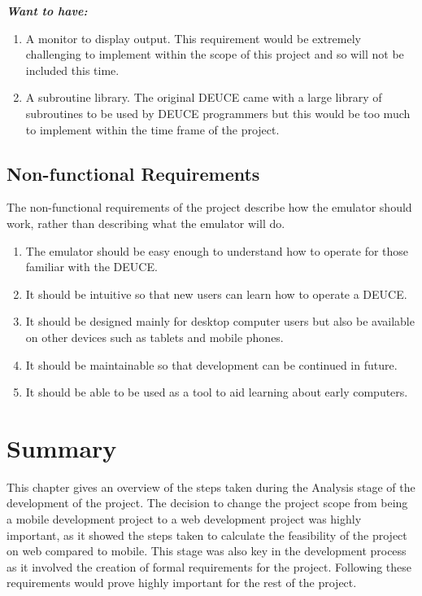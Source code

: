 \documentclass{l4proj}
\begin{document}
\textbf{\textit{Want to have:}}
\begin{enumerate}
	\item A monitor to display output. This requirement would be extremely challenging to implement within the scope of this project and so will not be included this time.
	\item A subroutine library. The original DEUCE came with a large library of subroutines to be used by DEUCE programmers but this would be too much to implement within the time frame of the project.
\end{enumerate}
\subsection{Non-functional Requirements}
The non-functional requirements of the project describe how the emulator should work, rather than describing what the emulator will do. 
\begin{enumerate}
	\item The emulator should be easy enough to understand how to operate for those familiar with the DEUCE.
	\item It should be intuitive so that new users can learn how to operate a DEUCE.
	\item It should be designed mainly for desktop computer users but also be available on other devices such as tablets and mobile phones.
	\item It should be maintainable so that development can be continued in future.
	\item It should be able to be used as a tool to aid learning about early computers.
\end{enumerate}

\section{Summary}
This chapter gives an overview of the steps taken during the Analysis stage of the development of the project. The decision to change the project scope from being a mobile development project to a web development project was highly important, as it showed the steps taken to calculate the feasibility of the project on web compared to mobile. This stage was also key in the development process as it involved the creation of formal requirements for the project. Following these requirements would prove highly important for the rest of the project.

\end{document}
